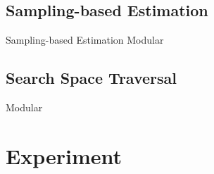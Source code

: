 \subsection{Sampling-based Estimation} \label{ssec:sampling}
Sampling-based Estimation
\sampling Modular



\begin{example}
\end{example}

\subsection{Search Space Traversal} \label{ssec:traversal}
\traversal Modular



\begin{example}
\end{example}
\section{Experiment}
\label{sec:exp}









